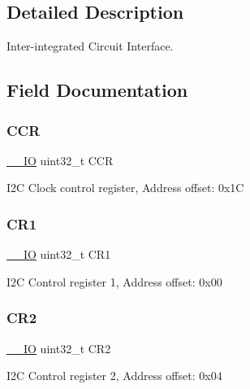 \subsection{Detailed Description}
Inter-\/integrated Circuit Interface. 

\subsection{Field Documentation}
\mbox{\label{struct_i2_c___type_def_a5e1322e27c40bf91d172f9673f205c97}} 
\subsubsection{\texorpdfstring{C\+CR}{CCR}}
{\footnotesize\ttfamily \mbox{\hyperlink{core__sc300_8h_aec43007d9998a0a0e01faede4133d6be}{\+\_\+\+\_\+\+IO}} uint32\+\_\+t C\+CR}

I2C Clock control register, Address offset\+: 0x1C \mbox{\label{struct_i2_c___type_def_ab0ec7102960640751d44e92ddac994f0}} 
\subsubsection{\texorpdfstring{C\+R1}{CR1}}
{\footnotesize\ttfamily \mbox{\hyperlink{core__sc300_8h_aec43007d9998a0a0e01faede4133d6be}{\+\_\+\+\_\+\+IO}} uint32\+\_\+t C\+R1}

I2C Control register 1, Address offset\+: 0x00 \mbox{\label{struct_i2_c___type_def_afdfa307571967afb1d97943e982b6586}} 
\subsubsection{\texorpdfstring{C\+R2}{CR2}}
{\footnotesize\ttfamily \mbox{\hyperlink{core__sc300_8h_aec43007d9998a0a0e01faede4133d6be}{\+\_\+\+\_\+\+IO}} uint32\+\_\+t C\+R2}

I2C Control register 2, Address offset\+: 0x04 \mbox{\label{struct_i2_c___type_def_a3df0d8dfcd1ec958659ffe21eb64fa94}} 
